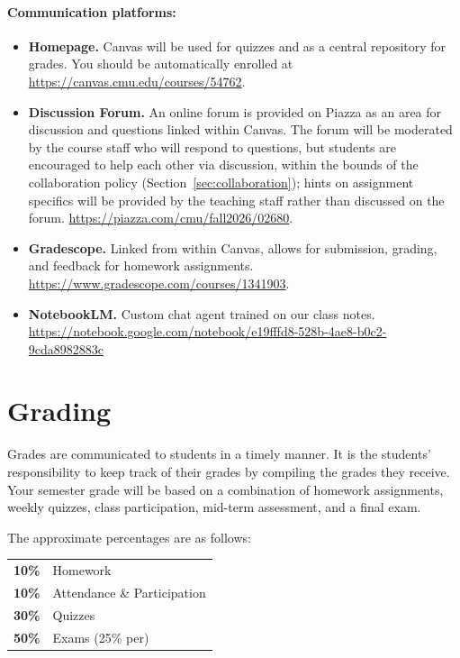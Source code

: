 \documentclass[12pt]{scrartcl}
\begin{document}
\paragraph{Communication platforms:}
\begin{itemize}
\item \textbf{Homepage.} 
Canvas will be used for quizzes and as a central repository for grades. 
You should be automatically enrolled at \url{https://canvas.cmu.edu/courses/54762}.
\item \textbf{Discussion Forum.} 
An online forum is provided on Piazza as an area for discussion and questions linked within Canvas. 
The forum will be moderated by the course staff who will respond to questions, 
but students are encouraged to help each other via discussion, 
within the bounds of the collaboration policy (Section~\ref{sec:collaboration}); 
hints on assignment specifics will be provided by the teaching staff rather than discussed on the forum. 
\url{https://piazza.com/cmu/fall2026/02680}.
\item \textbf{Gradescope.} 
Linked from within Canvas, allows for submission, grading, and feedback for homework assignments. 
\url{https://www.gradescope.com/courses/1341903}.
\item \textbf{NotebookLM.}
Custom chat agent trained on our class notes.
\url{https://notebook.google.com/notebook/e19fffd8-528b-4ae8-b0c2-9cda8982883c}
\end{itemize}

\section{Grading}

Grades are communicated to students in a timely manner. 
It is the students’ responsibility to keep track of their grades by compiling the grades they receive. 
Your semester grade will be based on a combination of homework assignments, weekly quizzes, class participation,  mid-term assessment, and a final exam. 

The approximate percentages are as follows:
\begin{center}
\begin{tabular}{rl}
\textbf{10\% } & Homework\\
\textbf{10\% } & Attendance \& Participation\\
\textbf{30\% } & Quizzes \\
\textbf{50\% } & Exams (25\% per)\\
\end{tabular}
\end{center}
\end{document}
